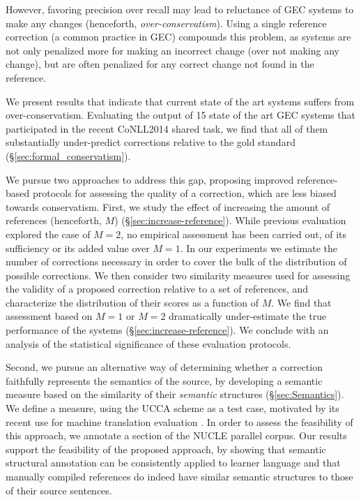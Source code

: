 \documentclass[letter,11pt]{article}
\begin{document}
However, favoring precision over recall may lead to reluctance of GEC
systems to make any changes (henceforth, {\it over-conservatism}).
Using a single reference correction (a common practice in GEC) compounds this problem,
as systems are not only penalized more for making an incorrect change (over not making
any change), but are often penalized for any correct change not found in the reference.

We present results that indicate that current state of the art systems suffers
from over-conservatism. Evaluating the output of 15 state
of the art GEC systems that participated
in the recent CoNLL2014 shared task, we find that all of them
substantially under-predict corrections relative to the gold standard
(\S\ref{sec:formal_conservatism}). 

We pursue two approaches to address this gap, proposing
improved reference-based protocols for assessing the quality of a correction,
which are less biased towards conservatism.
First, we study the effect of increasing the amount of references
(henceforth, $M$) (\S\ref{sec:increase-reference}).
While previous evaluation explored the case of $M=2$,
no empirical assessment has been carried out, of its sufficiency
or its added value over $M=1$.
In our experiments we estimate the number of corrections necessary in order
to cover the bulk of the distribution of possible corrections.
We then consider two similarity measures used for
assessing the validity of a proposed correction relative to a set of references,
and characterize the distribution of their scores as a function of $M$.
We find that assessment based on $M=1$ or $M=2$ dramatically under-estimate
the true performance of the systems (\S\ref{sec:increase-reference}). 
We conclude with an analysis of
the statistical significance of these evaluation protocols.


Second, we pursue an alternative way of determining whether a correction faithfully
represents the semantics of the source, by developing a semantic measure based
on the similarity of their {\it semantic} structures (\S\ref{sec:Semantics}).
We define a measure, using the UCCA scheme \cite{abend2013universal} as a
test case, motivated by its recent use for machine translation
evaluation \cite{birch2016hume}.
In order to assess the feasibility of this approach, we annotate a
section of the NUCLE \cite{dahlmeier2013building}
parallel corpus. Our results support the feasibility of the proposed approach,
by showing that semantic structural annotation can be consistently applied
to learner language and that manually compiled references do indeed
have similar semantic structures to those of their source sentences.
\end{document}
